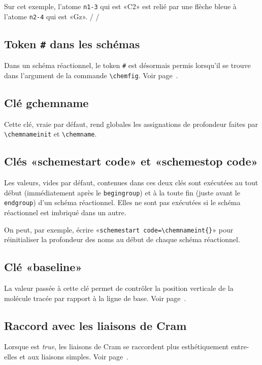 \documentclass[10pt,french]{article}
\makeatletter
\newcommand\make@car@active[1]{%
	\catcode`#1\active
	\begingroup
		\lccode`\~`#1\relax
		\lowercase{\endgroup\def~}%
}
\newif\if@exstar
\newcommand\exemple{%
	\begingroup
	\parskip\z@
	\@makeother\;\@makeother\!\@makeother\?\@makeother\:%
	\@ifstar{\@exstartrue\exemple@}{\@exstarfalse\exemple@}}
\newcommand\exemple@[2][65]{%
	\medbreak\noindent
	\begingroup
		\let\do\@makeother\dospecials
		\make@car@active\ { {}}%
		\make@car@active\^^M{\par\leavevmode}%
		\make@car@active\^^I{\space\space}%
		\make@car@active\,{\leavevmode\kern\z@\string,}%
		\make@car@active\-{\leavevmode\kern\z@\string-}%
		\make@car@active\>{\leavevmode\kern\z@\string>}%
		\make@car@active\<{\leavevmode\kern\z@\string<}%
		\exemple@@{#1}{#2}%
}
\newcommand\exemple@@[3]{%
	\def\@tempa##1#3{\exemple@@@{#1}{#2}{##1}}%
	\@tempa
}
\newcommand\exemple@@@[3]{%
	\xdef\the@code{#3}%
	\endgroup
	\if@exstar
		\begingroup
			\fboxrule0.4pt
			\let\breakboxparindent\z@
			\def\bkvz@bottom{\hrule\@height\fboxrule}%
			\let\bkvz@before@breakbox\relax
			\def\bkvz@set@linewidth{\advance\linewidth\dimexpr-2\fboxrule-2\fboxsep}%
			\def\bkvz@left{\vrule\@width\fboxrule\hskip\fboxsep}%
			\def\bkvz@right{\hskip\fboxsep\vrule\@width\fboxrule}%
			\def\bkvz@top{\hbox to \hsize{%
				\vrule\@width\fboxrule\@height\fboxrule
				\leaders\bkvz@bottom\hfill
				\sffamily
				\fboxsep\z@
				\colorbox{black}{\kern0.25em\color{white}\footnotesize\lower0.5ex\hbox{\strut#2}\kern0.25em}%
				\leaders\bkvz@bottom\hfill
				\vrule\@width\fboxrule\@height\fboxrule}}%
			\breakbox
				\kern.5ex\relax
				\ttfamily\footnotesize\the@code\par
				\normalfont
				\kern3pt
				\hrule height0.1pt width\linewidth depth0.1pt
				\vskip5pt
				\rightskip0pt plus 1fill
				\everypar{{\color{lightgray}\rlap{\vrule height0.1pt width\linewidth depth0.1pt}}\hskip0pt plus 1fill}%
				\newlinechar`\^^M\everyeof{\noexpand}\scantokens{#3}\par
			\endbreakbox
		\endgroup
	\else
		\vskip0.5ex
		\boxput*(0,1)
			{\fboxsep\z@
			\hbox{\sffamily\colorbox{black}{\leavevmode\kern0.25em{\color{white}\footnotesize\strut#2}\kern0.25em}}%
			}%
			{\fboxsep5pt
			\fbox{%
				$\vcenter{\hsize\dimexpr0.#1\linewidth-\fboxsep-\fboxrule\relax
					\kern5pt\parskip0pt \ttfamily\footnotesize\the@code}%
				\vcenter{\kern5pt\hsize\dimexpr\linewidth-0.#1\linewidth-\fboxsep-\fboxrule\relax
					\everypar{{\color{lightgray}\rlap{\vrule height0.1pt width\dimexpr\linewidth-0.#1\linewidth-\fboxsep-\fboxrule depth0.1pt}}}%
					\footnotesize\newlinechar`\^^M\everyeof{\noexpand}\scantokens{#3}}$%
				}%
			}%
	\fi
	\medbreak
	\endgroup
}
\newcommand*\CFkey[1]{{\color{teal}\texttt{\detokenize{#1}}}}
\newcommand*\CFval[1]{{\color{teal}\textlangle\textit{#1}\textrangle}}
\makeatother
\begin{document}
Sur cet exemple, l'atome \verb|n1-3| qui est «C2» est relié par une flèche bleue à l'atome \verb|n2-4| qui est «Gz».
\exemple{Nom des nœuds}/
/

\subsection{Token \texttt\# dans les schémas}
Dans un schéma réactionnel, le token \verb|#| est désormais permis lorsqu'il se trouve dans l'argument de la commande \verb|\chemfig|. Voir  page~\pageref{modif.retrait}.

\subsection{Clé gchemname}
Cette clé, vraie par défaut, rend globales les assignations de profondeur faites par \verb|\chemnameinit| et \verb|\chemname|.

\subsection{Clés «schemestart code» et «schemestop code»}
Les valeurs, vides par défaut, contenues dans ces deux clés sont exécutées au tout début (immédiatement après le \verb|begingroup|) et à la toute fin (juste avant le \verb|endgroup|) d'un schéma réactionnel. Elles ne sont pas exécutées si le schéma réactionnel est imbriqué dans un autre.

On peut, par exemple, écrire «\verb|schemestart code=\chemnameint{}|» pour réinitialiser la profondeur des noms au début de chaque schéma réactionnel.

\subsection{Clé «baseline»}
La valeur passée à cette clé permet de contrôler la position verticale de la molécule tracée par rapport à la ligne de base. Voir page~\pageref{baseline}.

\subsection{Raccord avec les liaisons de Cram}
Lorsque \CFkey{bond join} est \CFval{true}, les liaisons de Cram se raccordent plus esthétiquement entre-elles et aux liaisons simples. Voir page~\pageref{joinCram}.
\end{document}
